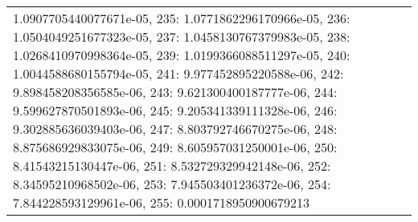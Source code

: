 \begin{tabular}{lrl}
1.0907705440077671e-05, 235: 1.0771862296170966e-05, 236: 1.0504049251677323e-05, 237: 1.0458130767379983e-05, 238: 1.0268410970998364e-05, 239: 1.0199366088511297e-05, 240: 1.0044588680155794e-05, 241: 9.977452895220588e-06, 242: 9.898458208356585e-06, 243: 9.621300400187777e-06, 244: 9.599627870501893e-06, 245: 9.205341339111328e-06, 246: 9.302885636039403e-06, 247: 8.803792746670275e-06, 248: 8.875686929833075e-06, 249: 8.605957031250001e-06, 250: 8.41543215130447e-06, 251: 8.532729329942148e-06, 252: 8.34595210968502e-06, 253: 7.945503401236372e-06, 254: 7.844228593129961e-06, 255: 0.0001718950900679213} \\
\end{tabular}
